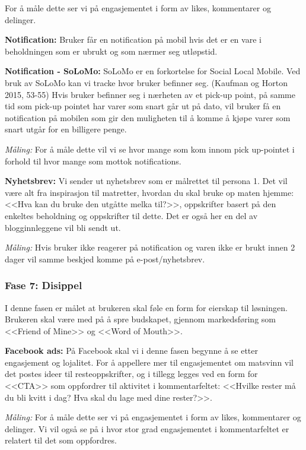 For å måle dette ser vi på engasjementet i form av likes, kommentarer og delinger. 

\textbf{Notification:} Bruker får en notification på mobil hvis det er en vare i beholdningen som er ubrukt og som nærmer seg utløpstid. 

\textbf{Notification - SoLoMo:} SoLoMo er en forkortelse for Social Local Mobile. Ved bruk av SoLoMo kan vi tracke hvor bruker befinner seg. (Kaufman og Horton 2015, 53-55) Hvis bruker befinner seg i nærheten av et pick-up point, på samme tid som pick-up pointet har varer som snart går ut på dato, vil bruker få en notification på mobilen som gir den muligheten til å komme å kjøpe varer som snart utgår for en billigere penge. 

\textit{Måling:} For å måle dette vil vi se hvor mange som kom innom pick up-pointet i forhold til hvor mange som mottok notifications. 

\textbf{Nyhetsbrev:} Vi sender ut nyhetsbrev som er målrettet til persona 1. Det vil være alt fra inspirasjon til matretter, hvordan du skal bruke op maten hjemme: <<Hva kan du bruke den utgåtte melka til?>>, oppskrifter basert på den enkeltes beholdning og oppskrifter til dette. Det er også her en del av blogginnleggene vil bli sendt ut. 

\textit{Måling:} Hvis bruker ikke reagerer på notification og varen ikke er brukt innen 2 dager vil samme beskjed komme på e-post/nyhetsbrev. 

\subsubsection{\textbf{Fase 7: Disippel}}
I denne fasen er målet at brukeren skal føle en form for eierskap til løsningen. Brukeren skal være med på å spre budskapet, gjennom markedsføring som <<Friend of Mine>> og <<Word of Mouth>>. 


\textbf{Facebook ads:} På Facebook skal vi i denne fasen begynne å se etter engasjement og lojalitet. For å appellere mer til engasjementet om matsvinn vil det postes ideer til resteoppskrifter, og i tillegg legges ved en form for <<CTA>> som oppfordrer til aktivitet i kommentarfeltet: <<Hvilke rester må du bli kvitt i dag? Hva skal du lage med dine rester?>>. 

\textit{Måling:} For å måle dette ser vi på engasjementet i form av likes, kommentarer og delinger. Vi vil også se på i hvor stor grad engasjementet i kommentarfeltet er relatert til det som oppfordres. 

